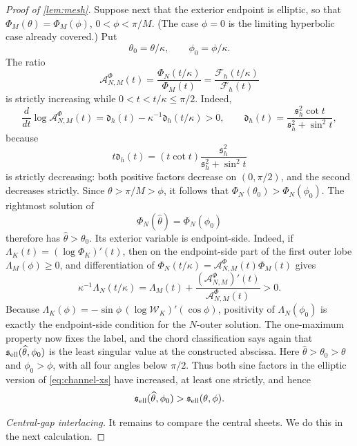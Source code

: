 \documentclass[review,hidelinks,onefignum,onetabnum]{siamart251216}
\begin{document}
\begin{proof}[Proof of \cref{lem:mesh}]
Suppose next that the exterior endpoint is elliptic, so that
\(\Phi_M(\theta)=\Phi_M(\phi)\), \(0<\phi<\pi/M\).  (The case
\(\phi=0\)
is the limiting hyperbolic case already covered.)  Put
\[
 \theta_0=\theta/\kappa,\qquad \phi_0=\phi/\kappa.
\]
The ratio
\[
 \mathcal A_{N,M}^{\Phi}(t)
 =\frac{\Phi_N(t/\kappa)}{\Phi_M(t)}
 =\frac{\mathcal F_h(t/\kappa)}{\mathcal F_h(t)}
\]
is strictly increasing while \(0<t<t/\kappa\leq\pi/2\).  Indeed,
\[
 \frac{d}{dt}\log\mathcal A_{N,M}^{\Phi}(t)
 =\mathfrak d_h(t)-\kappa^{-1}\mathfrak d_h(t/\kappa)>0,\qquad
 \mathfrak d_h(t)=\frac{\mathfrak s_h^2\cot t}
 {\mathfrak s_h^2+\sin^2t},
\]
because
\[
 t\mathfrak d_h(t)=(t\cot t)
 \frac{\mathfrak s_h^2}{\mathfrak s_h^2+\sin^2t}
\]
is strictly decreasing: both positive factors decrease on
\((0,\pi/2)\), and the second decreases strictly.  Since
\(\theta>\pi/M>\phi\), it follows that
\(\Phi_N(\theta_0)>\Phi_N(\phi_0)\).  The rightmost solution of
\[
 \Phi_N(\widehat\theta)=\Phi_N(\phi_0)
\]
therefore has \(\widehat\theta>\theta_0\).  Its exterior variable is
endpoint-side.  Indeed, if
\(\Lambda_K(t)=(\log\Phi_K)'(t)\), then on the
endpoint-side part of the first outer lobe
\(\Lambda_M(\phi)\geq0\), and differentiation of
\(\Phi_N(t/\kappa)=\mathcal A_{N,M}^{\Phi}(t)\Phi_M(t)\) gives
\[
 \kappa^{-1}\Lambda_N(t/\kappa)
 =\Lambda_M(t)
 +\frac{(\mathcal A_{N,M}^{\Phi})'(t)}{\mathcal A_{N,M}^{\Phi}(t)}>0.
\]
Because
\(\Lambda_K(\phi)=-\sin\phi\,(\log\mathcal W_K)'(\cos\phi)\),
positivity of \(\Lambda_N(\phi_0)\) is exactly the endpoint-side
condition for the
\(N\)-outer solution.  The one-maximum property now fixes the label, and the chord
classification says again that
\(\mathfrak s_{\rm ell}(\widehat\theta,\phi_0)\) is the least singular
value at the constructed abscissa.  Here
\(\widehat\theta>\theta_0>\theta\) and \(\phi_0>\phi\), with all four
angles below \(\pi/2\).  Thus both sine factors in the elliptic version
of \eqref{eq:channel-xs} have increased, at least one strictly, and hence
\begin{equation}\label{eq:elliptic-height-increase}
 \mathfrak s_{\rm ell}(\widehat\theta,\phi_0)
 >\mathfrak s_{\rm ell}(\theta,\phi).
\end{equation}

\medskip\noindent\emph{Central-gap interlacing.}\quad
It remains to compare the central sheets.  We do this in the next
calculation.


\end{proof}
\end{document}
